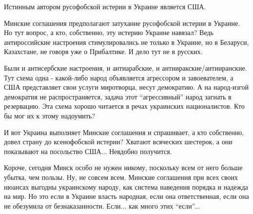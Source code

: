 Истинным автором русофобской истерии в Украине является США. 

Минские соглашения предполагают затухание русофобской истерии в Украине. Но тут
вопрос, а кто, собственно, эту истерию Украине навязал? Ведь антироссийские
настроения стимулировались не только в Украине, но в Беларуси, Казахстане, не
говоря уже о Прибалтике. И дело тут не в русских. 

Были и антисербские настроения, и антиарабские, и антииракские/антииранские.
Тут схема одна - какой-либо народ объявляется агрессором и завоевателем, а США
представляет свои услуги миротворца, несут демократию. А на народ-изгой
демократия не распространяется, задача этот \enquote{агрессивный} народ загнать в
резервацию. Эта схема хорошо читается в речах украинских националистов. Кто бы
мог их к этому надоумить?

И вот Украина выполняет Минские соглашения и спрашивает, а кто собственно,
довел страну до ксенофобской истерии? Хватают всяческих шестерок, а они
показывают на посольство США... Невдобно получится.  

Короче, сегодня Минск особо не нужен никому, поскольку всем от него больше
убытка, чем пользы. Ну, не совсем всем. Минские соглашения при всех своих
нюансах выгодны украинскому народу, как система наведения порядка и надежда на
мир. Но это если в Украине власть народная, если она ответственная, если она не
обезумила от безнаказанности. Если... как много этих \enquote{если}...
